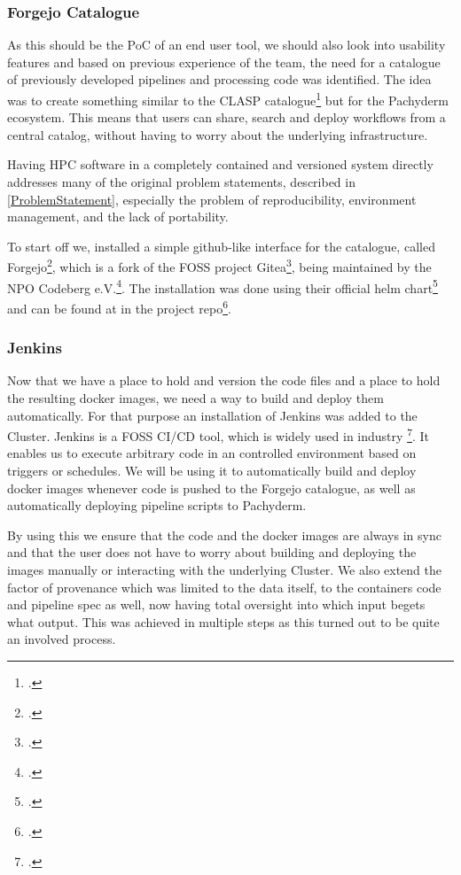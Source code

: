 \subsubsection{Forgejo Catalogue}

As this should be the \ac{PoC} of an end user tool, we should also look into usability features and based on previous experience of the team,
the need for a catalogue of previously developed pipelines and processing code was identified.
The idea was to create something similar to the \ac{CLASP} catalogue\footcite{sayersCLoudApplicationServices2015} but for the Pachyderm ecosystem.
This means that users can share, search and deploy workflows from a central catalog, without having to worry about the underlying infrastructure.

Having \ac{HPC} software in a completely contained and versioned system directly addresses many of the original problem statements,
described in \ref{ProblemStatement}, especially the problem of reproducibility, environment management, and the lack of portability.

To start off we, installed a simple github-like interface for the catalogue, called Forgejo\footcite{forgejoForgejo}, which is a fork of the \ac{FOSS} project Gitea\footcite{GiteaGitCup2023},
being maintained by the \ac{NPO} Codeberg e.V.\footcite{codebergCodebergOrg}.
The installation was done using their official helm chart\footcite{Forgejo13Forgejo} and can be found at in the project repo\footcite{eckerthProjectRepoForgejo}.

\subsubsection{Jenkins}

Now that we have a place to hold and version the code files and a place to hold the resulting docker images, we need a way to build and deploy them automatically.
For that purpose an installation of Jenkins was added to the Cluster. Jenkins is a \ac{FOSS} \ac{CI/CD} tool, which is widely used in industry \footcite{JenkinsMarketShare}.
It enables us to execute arbitrary code in an controlled environment based on triggers or schedules.
We will be using it to automatically build and deploy docker images whenever code is pushed to the Forgejo catalogue, as well as automatically deploying pipeline scripts to Pachyderm.

By using this we ensure that the code and the docker images are always in sync and that the user does not have to worry about building and deploying the images manually or interacting with the underlying Cluster.
We also extend the factor of provenance which was limited to the data itself, to the containers code and pipeline spec as well, now having total oversight into which input begets what output.
This was achieved in multiple steps as this turned out to be quite an involved process.

